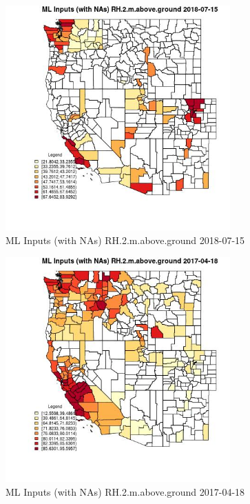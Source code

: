 \begin{figure} 
\centering  
\includegraphics[width=0.77\textwidth]{Code_Outputs/Report_ML_input_PM25_Step4_part_e_de_duplicated_aves_compiled_2019-05-21wNAs_CountyRH2mabovegroundMean2018-07-15.jpg} 
\caption{\label{fig:Report_ML_input_PM25_Step4_part_e_de_duplicated_aves_compiled_2019-05-21wNAsCountyRH2mabovegroundMean2018-07-15}ML Inputs (with NAs) RH.2.m.above.ground 2018-07-15} 
\end{figure} 
 

\begin{figure} 
\centering  
\includegraphics[width=0.77\textwidth]{Code_Outputs/Report_ML_input_PM25_Step4_part_e_de_duplicated_aves_compiled_2019-05-21wNAs_CountyRH2mabovegroundMean2017-04-18.jpg} 
\caption{\label{fig:Report_ML_input_PM25_Step4_part_e_de_duplicated_aves_compiled_2019-05-21wNAsCountyRH2mabovegroundMean2017-04-18}ML Inputs (with NAs) RH.2.m.above.ground 2017-04-18} 
\end{figure} 
 

